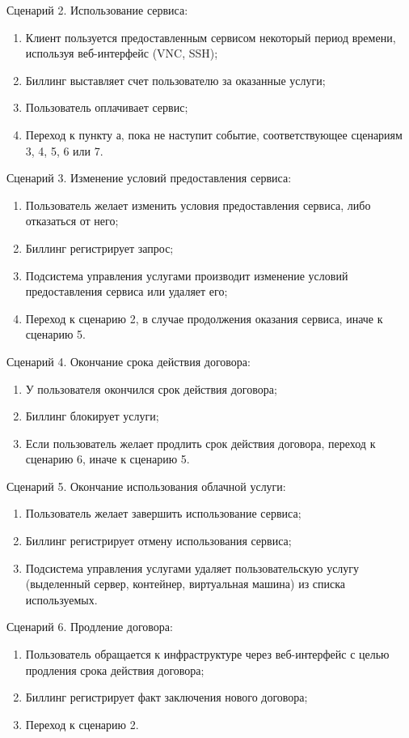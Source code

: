 Сценарий 2. Использование сервиса:
\begin{enumerate}
  \item Клиент пользуется предоставленным сервисом некоторый период времени, используя веб-интерфейс (VNC, SSH);
  \item Биллинг выставляет счет пользователю за оказанные услуги;
  \item Пользователь оплачивает сервис;
  \item Переход к пункту а, пока не наступит событие, соответствующее сценариям 3, 4, 5, 6 или 7.
\end{enumerate}

Сценарий 3. Изменение условий предоставления сервиса:
\begin{enumerate}
  \item Пользователь желает изменить условия предоставления сервиса, либо отказаться от него;
  \item Биллинг регистрирует запрос;
  \item Подсистема управления услугами производит изменение условий предоставления сервиса или удаляет его;
  \item Переход к сценарию 2, в случае продолжения оказания сервиса, иначе к сценарию 5.
\end{enumerate}

Сценарий 4. Окончание срока действия договора:
\begin{enumerate}
  \item У пользователя окончился срок действия договора;
  \item Биллинг блокирует услуги;
  \item Если пользователь желает продлить срок действия договора, переход к сценарию 6, иначе к сценарию 5.
\end{enumerate}

Сценарий 5. Окончание использования облачной услуги:
\begin{enumerate}
  \item Пользователь желает завершить использование сервиса;
  \item Биллинг регистрирует отмену использования сервиса;
  \item Подсистема управления услугами удаляет пользовательскую услугу (выделенный сервер, контейнер, виртуальная машина) из списка используемых.
\end{enumerate}

Сценарий 6. Продление договора:
\begin{enumerate}
  \item Пользователь обращается к инфраструктуре через веб-интерфейс с целью продления срока действия договора;
  \item Биллинг регистрирует факт заключения нового договора;
  \item Переход к сценарию 2.
\end{enumerate}

